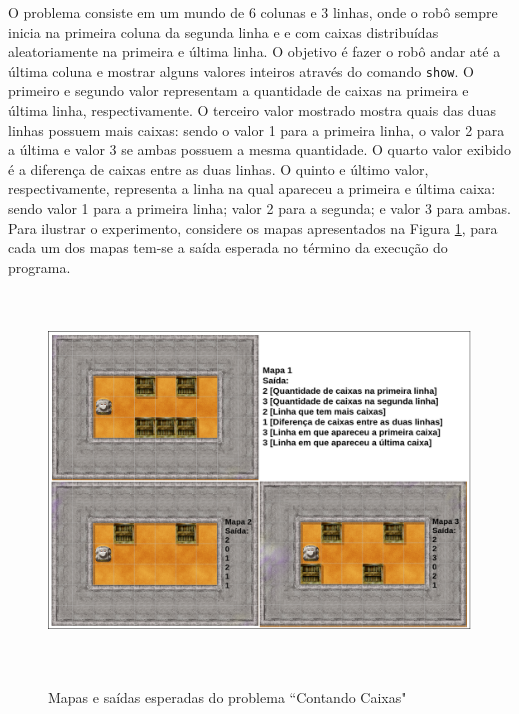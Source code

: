 \label{sec:defprob}
O problema consiste em um mundo de 6 colunas e 3 linhas, onde o robô sempre inicia na primeira coluna da segunda linha e e com caixas distribuídas aleatoriamente na primeira e última linha. O objetivo é fazer o robô andar até a última coluna e mostrar alguns valores inteiros através do comando \texttt{show}. O primeiro e segundo valor representam a quantidade de caixas na primeira e última linha, respectivamente. O terceiro valor mostrado mostra quais das duas linhas possuem mais caixas: sendo o valor 1 para a primeira linha, o valor 2 para a última e valor 3 se ambas possuem a mesma quantidade. O quarto valor exibido é a diferença de caixas entre as duas linhas. O quinto e último valor, respectivamente, representa a linha na qual apareceu a primeira e última caixa: sendo valor 1 para a primeira linha; valor 2 para a segunda; e valor 3 para ambas. Para ilustrar o experimento, considere os mapas apresentados na Figura \ref{fig:problem}, para cada um dos mapas tem-se a saída esperada no término da execução do programa.

\begin{figure}[h]
\centering
\caption{Mapas e saídas esperadas do problema ``Contando Caixas"}
\includegraphics[height=10cm]{figuras/problema.png}
\label{fig:problem}
\end{figure}

